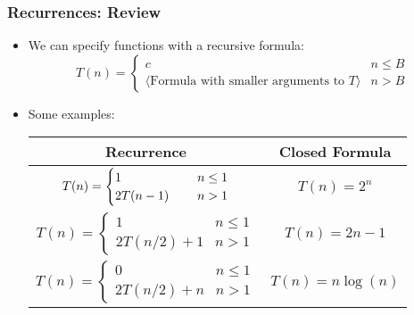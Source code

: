 \documentclass{beamer}
\begin{document}
\begin{frame}
  \frametitle{Recurrences: Review}
  \begin{itemize}[<+->]
    \item We can specify functions with a recursive formula:
    \begin{equation*}
      T(n) = \begin{cases}
        c & n \leq B \\
        \langle \text{Formula with smaller arguments to $T$} \rangle & n > B
      \end{cases}
    \end{equation*}
    \item Some examples:
    
    \begin{tabular}{ c | c }
      Recurrence & Closed Formula \\\hline
      $T(n) = \begin{cases}
        1 & n \leq 1 \\
        2T(n - 1)\hphantom{+ 1} & n > 1
      \end{cases}$ & $T(n) = 2^n$ \\\hline 
      $T(n) = \begin{cases}
        1 & n \leq 1 \\
        2T(n/2) + 1 & n > 1
      \end{cases}$ & $T(n) = 2n - 1$ \\ \hline
      $T(n) = \begin{cases}
        0 & n \leq 1 \\
        2T(n/2) + n & n > 1
      \end{cases}$ & $T(n) = n\log(n)$ \\    
     \end{tabular}
  \end{itemize}
\end{frame}
\end{document}

